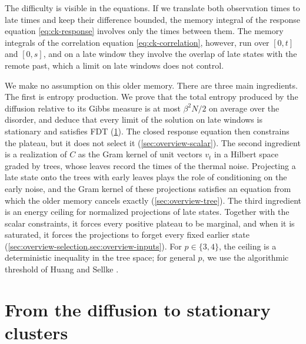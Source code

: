 The difficulty is visible in the equations. If we translate both observation times to late times and keep their difference bounded, the memory integral of the response equation \eqref{eq:ck-response} involves only the times between them. The memory integrals of the correlation equation \eqref{eq:ck-correlation}, however, run over $[0,t]$ and $[0,s]$, and on a late window they involve the overlap of late states with the remote past, which a limit on late windows does not control.

We make no assumption on this older memory. There are three main ingredients. The first is entropy production. We prove that the total entropy produced by the diffusion relative to its Gibbs measure is at most $\beta^2N/2$ on average over the disorder, and deduce that every limit of the solution on late windows is stationary and satisfies FDT (\cref{sec:overview-clusters}). The closed response equation then constrains the plateau, but it does not select it (\cref{sec:overview-scalar}). The second ingredient is a realization of $C$ as the Gram kernel of unit vectors $v_t$ in a Hilbert space graded by trees, whose leaves record the times of the thermal noise. Projecting a late state onto the trees with early leaves plays the role of conditioning on the early noise, and the Gram kernel of these projections satisfies an equation from which the older memory cancels exactly (\cref{sec:overview-tree}). The third ingredient is an energy ceiling for normalized projections of late states. Together with the scalar constraints, it forces every positive plateau to be marginal, and when it is saturated, it forces the projections to forget every fixed earlier state (\cref{sec:overview-selection,sec:overview-inputs}). For $p\in\{3,4\}$, the ceiling is a deterministic inequality in the tree space; for general $p$, we use the algorithmic threshold of Huang and Sellke \cite[Theorem~1 and Corollary~1.8]{hs2023}.

\section{From the diffusion to stationary clusters}\label{sec:overview-clusters}


